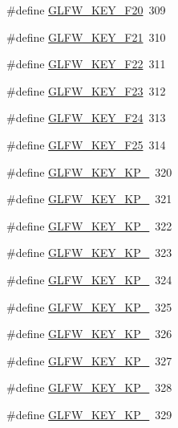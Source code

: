 \begin{DoxyCompactItemize}
\item 
\#define \mbox{\hyperlink{group__keys_ga82b9c721ada04cd5ca8de767da38022f}{G\+L\+F\+W\+\_\+\+K\+E\+Y\+\_\+\+F20}}~309
\item 
\#define \mbox{\hyperlink{group__keys_ga356afb14d3440ff2bb378f74f7ebc60f}{G\+L\+F\+W\+\_\+\+K\+E\+Y\+\_\+\+F21}}~310
\item 
\#define \mbox{\hyperlink{group__keys_ga90960bd2a155f2b09675324d3dff1565}{G\+L\+F\+W\+\_\+\+K\+E\+Y\+\_\+\+F22}}~311
\item 
\#define \mbox{\hyperlink{group__keys_ga43c21099aac10952d1be909a8ddee4d5}{G\+L\+F\+W\+\_\+\+K\+E\+Y\+\_\+\+F23}}~312
\item 
\#define \mbox{\hyperlink{group__keys_ga8150374677b5bed3043408732152dea2}{G\+L\+F\+W\+\_\+\+K\+E\+Y\+\_\+\+F24}}~313
\item 
\#define \mbox{\hyperlink{group__keys_gaa4bbd93ed73bb4c6ae7d83df880b7199}{G\+L\+F\+W\+\_\+\+K\+E\+Y\+\_\+\+F25}}~314
\item 
\#define \mbox{\hyperlink{group__keys_ga10515dafc55b71e7683f5b4fedd1c70d}{G\+L\+F\+W\+\_\+\+K\+E\+Y\+\_\+\+K\+P\+\_}}~320
\item 
\#define \mbox{\hyperlink{group__keys_gaf3a29a334402c5eaf0b3439edf5587c3}{G\+L\+F\+W\+\_\+\+K\+E\+Y\+\_\+\+K\+P\+\_}}~321
\item 
\#define \mbox{\hyperlink{group__keys_gaf82d5a802ab8213c72653d7480c16f13}{G\+L\+F\+W\+\_\+\+K\+E\+Y\+\_\+\+K\+P\+\_}}~322
\item 
\#define \mbox{\hyperlink{group__keys_ga7e25ff30d56cd512828c1d4ae8d54ef2}{G\+L\+F\+W\+\_\+\+K\+E\+Y\+\_\+\+K\+P\+\_}}~323
\item 
\#define \mbox{\hyperlink{group__keys_gada7ec86778b85e0b4de0beea72234aea}{G\+L\+F\+W\+\_\+\+K\+E\+Y\+\_\+\+K\+P\+\_}}~324
\item 
\#define \mbox{\hyperlink{group__keys_ga9a5be274434866c51738cafbb6d26b45}{G\+L\+F\+W\+\_\+\+K\+E\+Y\+\_\+\+K\+P\+\_}}~325
\item 
\#define \mbox{\hyperlink{group__keys_gafc141b0f8450519084c01092a3157faa}{G\+L\+F\+W\+\_\+\+K\+E\+Y\+\_\+\+K\+P\+\_}}~326
\item 
\#define \mbox{\hyperlink{group__keys_ga8882f411f05d04ec77a9563974bbfa53}{G\+L\+F\+W\+\_\+\+K\+E\+Y\+\_\+\+K\+P\+\_}}~327
\item 
\#define \mbox{\hyperlink{group__keys_gab2ea2e6a12f89d315045af520ac78cec}{G\+L\+F\+W\+\_\+\+K\+E\+Y\+\_\+\+K\+P\+\_}}~328
\item 
\#define \mbox{\hyperlink{group__keys_gafb21426b630ed4fcc084868699ba74c1}{G\+L\+F\+W\+\_\+\+K\+E\+Y\+\_\+\+K\+P\+\_}}~329

\end{DoxyCompactItemize}
